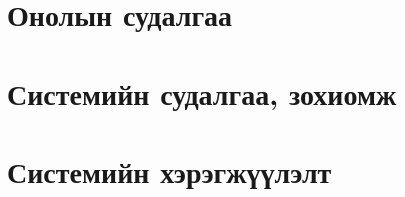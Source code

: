 \chapter{Онолын судалгаа}

\chapter{Системийн судалгаа, зохиомж}

\chapter{Системийн хэрэгжүүлэлт}

